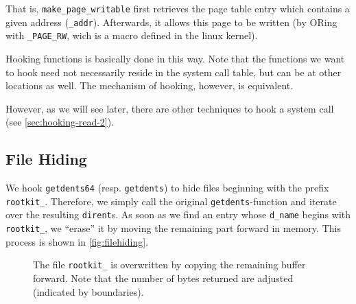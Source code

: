\documentclass[10pt, letterpaper]{article}
\newcommand{\todo}[1]{}%
\begin{document}
That is, \texttt{make\_page\_writable} first retrieves the page table entry which contains a given address (\texttt{\_addr}). Afterwards, it allows this page to be written (by ORing with \texttt{\_PAGE\_RW}, wich is a macro defined in the linux kernel). \todo{Is this correct, what I'm writing here?}

Hooking functions is basically done in this way. Note that the functions we want to hook need not necessarily reside in the system call table, but can be at other locations as well. The mechanism of hooking, however, is equivalent.

However, as we will see later, there are other techniques to hook a system call (see \autoref{sec:hooking-read-2}).

\subsection{File Hiding}
\label{filehiding}

We hook \texttt{getdents64} (resp. \texttt{getdents}) to hide files beginning with the prefix \texttt{rootkit\_}. 
Therefore, we simply call the original \texttt{getdents}-function and iterate over the resulting
\texttt{dirent}s. As soon as we find an entry whose \texttt{d\_name} begins with \texttt{rootkit\_},
we ``erase'' it by moving the remaining part forward in memory. This process is shown in \autoref{fig:filehiding}.


\begin{figure}[ht]
\centering
{}
\caption{The file \texttt{rootkit\_} is overwritten by copying the remaining buffer forward. Note that the number of bytes returned are adjusted (indicated by boundaries).}
\label{fig:filehiding}
\end{figure}
\end{document}
